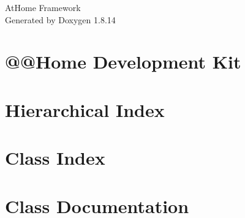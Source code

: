 \documentclass[twoside]{book}
\newcommand{\+}{\discretionary{\mbox{\scriptsize$\hookleftarrow$}}{}{}}
\newcommand{\clearemptydoublepage}{%
  \newpage{\pagestyle{empty}\cleardoublepage}%
}
\begin{document}
\hypersetup{pageanchor=false,
             bookmarksnumbered=true,
             pdfencoding=unicode
            }
\begin{titlepage}
\vspace*{7cm}
\begin{center}%
{\Large At\+Home Framework }\\
\vspace*{1cm}
{\large Generated by Doxygen 1.8.14}\\
\end{center}
\end{titlepage}
\clearemptydoublepage
{}
\tableofcontents
\clearemptydoublepage
{}
\hypersetup{pageanchor=true}

\chapter{@@Home Development Kit}
\label{index}\hypertarget{index}{}
\chapter{Hierarchical Index}

\chapter{Class Index}

\chapter{Class Documentation}





























\backmatter
\newpage
{}
\clearemptydoublepage
{}
\printindex
\end{document}
